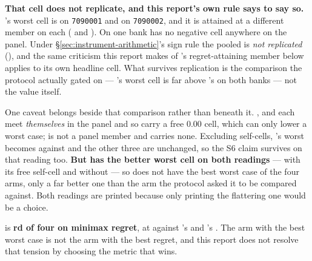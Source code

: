 \textbf{That cell does not replicate, and this report's own rule says to say so.} \frozen{}'s worst
cell is \vsevenWorstFrozenBankOne{} on \texttt{7090001} and \vsevenWorstFrozenBankTwo{} on
\texttt{7090002}, and it is attained at a different member on each
(\texttt{\vsevenWorstFrozenBankOneOpp{}} and \texttt{\vsevenWorstFrozenBankTwoOpp{}}). On one bank
\frozen{} has no negative cell anywhere on the panel. Under \S\ref{sec:instrument-arithmetic}'s sign
rule the pooled \vsevenWorstFrozen{} is \emph{not replicated}
(\vsevenWorstFrozenRepl{}), and the same criticism this report makes of \incumbent{}'s
regret-attaining member below applies to its own headline cell. What survives replication is the
comparison the protocol actually gated on --- \frozen{}'s worst cell is far above \incumbent{}'s on
both banks --- not the value \vsevenWorstFrozen{} itself.

One caveat belongs beside that comparison rather than beneath it. \incumbent{}, \fcheap{} and
\composite{} each meet \emph{themselves} in the panel and so carry a free $0.00$ cell, which can only
lower a worst case; \frozen{} is not a panel member and carries none. Excluding self-cells,
\composite{}'s worst becomes
\vsevenWorstCompositeExSelf{} against \vsevenWorstCompositeExSelfOpp{} and the other three are
unchanged, so the S6 claim survives on that reading too. \textbf{But \composite{} has the better
worst cell on both readings} --- \vsevenWorstComposite{} with its free self-cell and
\vsevenWorstCompositeExSelf{} without --- so \frozen{} does not have the best worst case of the four
arms, only a far better one than the arm the protocol asked it to be compared against. Both readings
are printed because only printing the flattering one would be a choice.

\begin{table}[t]\centering
\caption{Minimax regret over the shared panel, best first. The protocol sets no threshold on this
quantity; it requires it to be reported and to lead. It does not favour the frozen configuration.}
\label{tab:regret}

\end{table}

\frozen{} is \textbf{\vsevenRegretFrozenRank{}rd of four on minimax regret}, at
\vsevenRegretFrozen{} against \vsevenRegretBest{}'s \vsevenRegretFcheap{} and \composite{}'s
\vsevenRegretComposite{}. The arm with the best worst case is not the arm with the best regret, and
this report does not resolve that tension by choosing the metric that wins.

